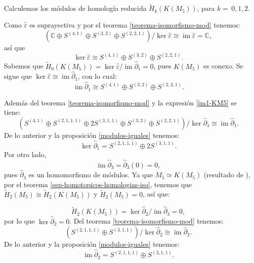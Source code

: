 \documentclass[12pt]{book}
\theoremstyle{definition}
\DeclareMathOperator{\im}{im}
\newcounter{in}
\begin{document}
Calculemos los módulos de homología reducida $\widetilde
H_{k}(K(M_{5}))$, para $k=~0,1,2$.

Como $\widehat\varepsilon$ es suprayectiva y por el teorema \ref{teorema-isomorfismo-mod} tenemos:
\begin{equation*}
  (\mathbb{C}\oplus S^{(4,1)}\oplus S^{(3,2)}\oplus
  S^{(2,2,1)})/\ker\widehat\varepsilon\cong \im \widehat\varepsilon=\mathbb{C},
\end{equation*}
así que
\begin{equation*}
  \label{ker0-KM5}
  \ker\widehat\varepsilon\cong S^{(4,1)} \oplus S^{(3,2)}\oplus S^{(2,2,1)}.
\end{equation*}
Sabemos que $\widetilde H_{0}(K(M_{5}))=\ker \widehat\varepsilon/\im
\widehat\partial_{1}=0$, pues $K(M_{5})$ es conexo. Se sigue que $\ker \widehat\varepsilon\cong
\im\widehat\partial_{1}$, con lo cual:
\begin{equation}
  \label{im1-KM5}
  \im \widehat\partial_{1}\cong S^{(4,1)} \oplus S^{(3,2)}\oplus S^{(2,2,1)}.
\end{equation}

Además del teorema \ref{teorema-isomorfismo-mod} y la expresión \ref{im1-KM5} se tiene:
$$(S^{(4,1)}\oplus S^{(2,1,1,1)}\oplus 2S^{(3,1,1)}\oplus S^{(3,2)}
\oplus S^{(2,2,1)})/\ker \widehat\partial_{1}\cong \im \widehat\partial_{1}.$$
De lo anterior y la proposición \ref{modulos-iguales} tenemos:
\begin{equation}
  \label{ker1-KM5}
  \ker \widehat\partial_{1}=S^{(2,1,1,1)}\oplus 2S^{(3,1,1)}.
\end{equation}
Por otro lado,
\begin{equation*}
  \im\widehat\partial_{3}=\widehat\partial_{3}(0)=0,
  \label{im3-KM5}
\end{equation*}
pues $\widehat\partial_{3}$ es un homomorfismo de módulos. Ya que
$M_{5}\simeq K(M_{5})$ (resultado de \cite{larrion2009clique}), por el teorema
\ref{esp-homotopicos-homologias-iso}, tenemos que $\widetilde
H_{2}(M_{5})\cong\widetilde H_{2}(K(M_{5}))$ y  $\widetilde H_{2}(M_{5})=0$, así que:

\begin{equation*}
\widetilde H_{2}(K(M_{5}))=\ker \widehat\partial_{2}/\im \widehat\partial_{3}=0,
\end{equation*}
por lo que $\ker \widehat\partial_{2}=0$. Del teorema
\ref{teorema-isomorfismo-mod} tenemos:
$$(S^{(2,1,1,1)}\oplus S^{(3,1,1)})/\ker \widehat\partial_{2}\cong \im
\widehat\partial_{2}.$$
De lo anterior y la proposición \ref{modulos-iguales} tenemos:
\begin{equation}
  \im \widehat\partial_{2}=S^{(2,1,1,1)}\oplus S^{(3,1,1)}.
  \label{im2-KM5}
\end{equation}
\end{document}
